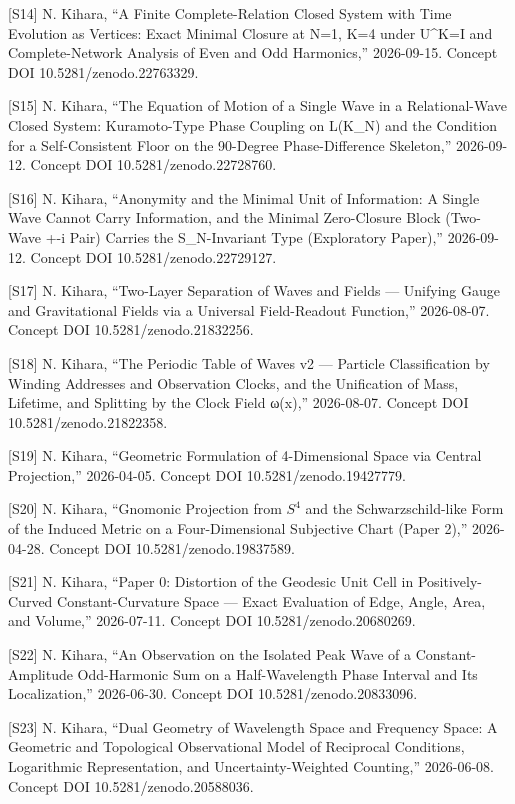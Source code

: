 \documentclass[
  a4paper,
]{article}
\begin{document}
{[}S14{]} N. Kihara, ``A Finite Complete-Relation Closed System with
Time Evolution as Vertices: Exact Minimal Closure at N=1, K=4 under
U\^{}K=I and Complete-Network Analysis of Even and Odd Harmonics,''
2026-09-15. Concept DOI 10.5281/zenodo.22763329.

{[}S15{]} N. Kihara, ``The Equation of Motion of a Single Wave in a
Relational-Wave Closed System: Kuramoto-Type Phase Coupling on L(K\_N)
and the Condition for a Self-Consistent Floor on the 90-Degree
Phase-Difference Skeleton,'' 2026-09-12. Concept DOI
10.5281/zenodo.22728760.

{[}S16{]} N. Kihara, ``Anonymity and the Minimal Unit of Information: A
Single Wave Cannot Carry Information, and the Minimal Zero-Closure Block
(Two-Wave +-i Pair) Carries the S\_N-Invariant Type (Exploratory
Paper),'' 2026-09-12. Concept DOI 10.5281/zenodo.22729127.

{[}S17{]} N. Kihara, ``Two-Layer Separation of Waves and Fields ---
Unifying Gauge and Gravitational Fields via a Universal Field-Readout
Function,'' 2026-08-07. Concept DOI 10.5281/zenodo.21832256.

{[}S18{]} N. Kihara, ``The Periodic Table of Waves v2 --- Particle
Classification by Winding Addresses and Observation Clocks, and the
Unification of Mass, Lifetime, and Splitting by the Clock Field ω(x),''
2026-08-07. Concept DOI 10.5281/zenodo.21822358.

{[}S19{]} N. Kihara, ``Geometric Formulation of 4-Dimensional Space via
Central Projection,'' 2026-04-05. Concept DOI 10.5281/zenodo.19427779.

{[}S20{]} N. Kihara, ``Gnomonic Projection from \(S^4\) and the
Schwarzschild-like Form of the Induced Metric on a Four-Dimensional
Subjective Chart (Paper 2),'' 2026-04-28. Concept DOI
10.5281/zenodo.19837589.

{[}S21{]} N. Kihara, ``Paper 0: Distortion of the Geodesic Unit Cell in
Positively-Curved Constant-Curvature Space --- Exact Evaluation of Edge,
Angle, Area, and Volume,'' 2026-07-11. Concept DOI
10.5281/zenodo.20680269.

{[}S22{]} N. Kihara, ``An Observation on the Isolated Peak Wave of a
Constant-Amplitude Odd-Harmonic Sum on a Half-Wavelength Phase Interval
and Its Localization,'' 2026-06-30. Concept DOI 10.5281/zenodo.20833096.

{[}S23{]} N. Kihara, ``Dual Geometry of Wavelength Space and Frequency
Space: A Geometric and Topological Observational Model of Reciprocal
Conditions, Logarithmic Representation, and Uncertainty-Weighted
Counting,'' 2026-06-08. Concept DOI 10.5281/zenodo.20588036.
\end{document}
